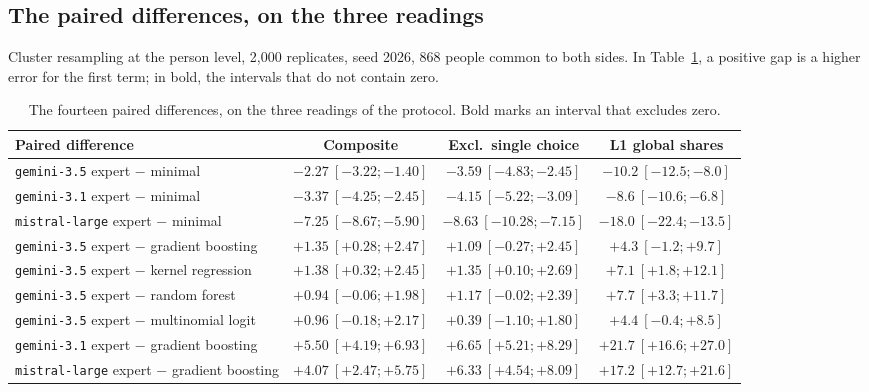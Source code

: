 \subsection{The paired differences, on the three readings}

Cluster resampling at the person level, 2{,}000 replicates, seed 2026, 868 people common to both sides. In Table~\ref{tab:paired}, a positive gap is a higher error for the first term; in bold, the intervals that do not contain zero.

\begin{table}[tp]
  \caption{The fourteen paired differences, on the three readings of the protocol. Bold marks an interval that excludes zero.}
  \label{tab:paired}
  \small
  \setlength{\tabcolsep}{4pt}
  \begin{tabular}{@{}lccc@{}}
    \toprule
    Paired difference & Composite & Excl.\ single choice & L1 global shares \\
    \midrule
    \texttt{gemini-3.5} expert $-$ minimal        & $\mathbf{-2.27}\ [-3.22; -1.40]$ & $\mathbf{-3.59}\ [-4.83; -2.45]$ & $\mathbf{-10.2}\ [-12.5; -8.0]$ \\
    \texttt{gemini-3.1} expert $-$ minimal        & $\mathbf{-3.37}\ [-4.25; -2.45]$ & $\mathbf{-4.15}\ [-5.22; -3.09]$ & $\mathbf{-8.6}\ [-10.6; -6.8]$ \\
    \texttt{mistral-large} expert $-$ minimal     & $\mathbf{-7.25}\ [-8.67; -5.90]$ & $\mathbf{-8.63}\ [-10.28; -7.15]$ & $\mathbf{-18.0}\ [-22.4; -13.5]$ \\
    \midrule
    \texttt{gemini-3.5} expert $-$ gradient boosting & $\mathbf{+1.35}\ [+0.28; +2.47]$ & $+1.09\ [-0.27; +2.45]$ & $+4.3\ [-1.2; +9.7]$ \\
    \texttt{gemini-3.5} expert $-$ kernel regression & $\mathbf{+1.38}\ [+0.32; +2.45]$ & $\mathbf{+1.35}\ [+0.10; +2.69]$ & $\mathbf{+7.1}\ [+1.8; +12.1]$ \\
    \texttt{gemini-3.5} expert $-$ random forest     & $+0.94\ [-0.06; +1.98]$ & $+1.17\ [-0.02; +2.39]$ & $\mathbf{+7.7}\ [+3.3; +11.7]$ \\
    \texttt{gemini-3.5} expert $-$ multinomial logit & $+0.96\ [-0.18; +2.17]$ & $+0.39\ [-1.10; +1.80]$ & $+4.4\ [-0.4; +8.5]$ \\
    \texttt{gemini-3.1} expert $-$ gradient boosting & $\mathbf{+5.50}\ [+4.19; +6.93]$ & $\mathbf{+6.65}\ [+5.21; +8.29]$ & $\mathbf{+21.7}\ [+16.6; +27.0]$ \\
    \texttt{mistral-large} expert $-$ gradient boosting & $\mathbf{+4.07}\ [+2.47; +5.75]$ & $\mathbf{+6.33}\ [+4.54; +8.09]$ & $\mathbf{+17.2}\ [+12.7; +21.6]$ \\

\end{tabular}
\end{table}

